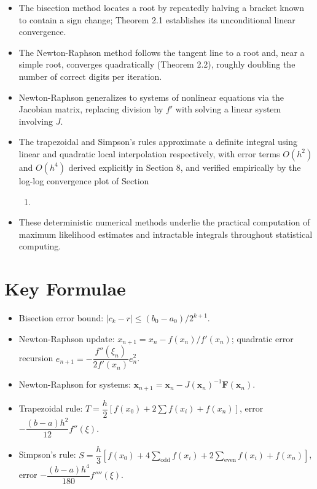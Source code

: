 \documentclass[
]{article}
\providecommand{\tightlist}{%
  \setlength{\itemsep}{0pt}\setlength{\parskip}{0pt}}
\begin{document}
\begin{itemize}
\tightlist
\item
  The bisection method locates a root by repeatedly halving a bracket
  known to contain a sign change; Theorem 2.1 establishes its
  unconditional linear convergence.
\item
  The Newton-Raphson method follows the tangent line to a root and, near
  a simple root, converges quadratically (Theorem 2.2), roughly doubling
  the number of correct digits per iteration.
\item
  Newton-Raphson generalizes to systems of nonlinear equations via the
  Jacobian matrix, replacing division by \(f'\) with solving a linear
  system involving \(J\).
\item
  The trapezoidal and Simpson's rules approximate a definite integral
  using linear and quadratic local interpolation respectively, with
  error terms \(O(h^2)\) and \(O(h^4)\) derived explicitly in Section 8,
  and verified empirically by the log-log convergence plot of Section

  \begin{enumerate}
  \def\labelenumi{\arabic{enumi}.}
  \setcounter{enumi}{9}
  \tightlist
  \item
  \end{enumerate}
\item
  These deterministic numerical methods underlie the practical
  computation of maximum likelihood estimates and intractable integrals
  throughout statistical computing.
\end{itemize}

\section{Key Formulae}\label{key-formulae}

\begin{itemize}
\tightlist
\item
  Bisection error bound: \(|c_k-r| \le (b_0-a_0)/2^{k+1}\).
\item
  Newton-Raphson update: \(x_{n+1}=x_n - f(x_n)/f'(x_n)\); quadratic
  error recursion \(e_{n+1} = -\dfrac{f''(\xi_n)}{2f'(x_n)}e_n^2\).
\item
  Newton-Raphson for systems: \(\mathbf x_{n+1} = \mathbf x_n -
  J(\mathbf x_n)^{-1}\mathbf F(\mathbf x_n)\).
\item
  Trapezoidal rule: \(T=\dfrac{h}{2}[f(x_0)+2\sum f(x_i)+f(x_n)]\),
  error \(-\dfrac{(b-a)h^2}{12}f''(\xi)\).
\item
  Simpson's rule: \(S=\dfrac{h}{3}[f(x_0)+4\sum_{\text{odd}}f(x_i)
  +2\sum_{\text{even}}f(x_i)+f(x_n)]\), error
  \(-\dfrac{(b-a)h^4}{180}f''''(\xi)\).
\end{itemize}
\end{document}
